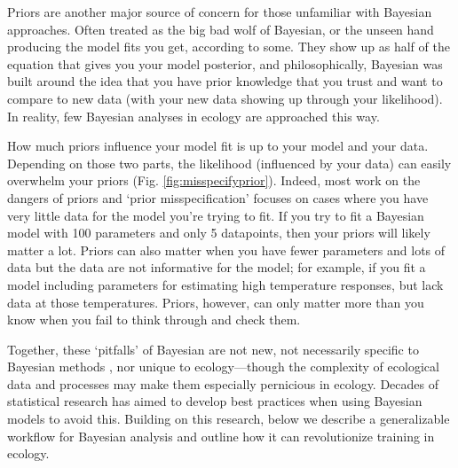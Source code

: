 \documentclass[11pt]{article}
\begin{document}
{%
Priors are another major source of concern for those unfamiliar with Bayesian approaches. Often treated as the big bad wolf of Bayesian, or the unseen hand producing the model fits you get, according to some. They show up as half of the equation that gives you your model posterior, and philosophically, Bayesian was built around the idea that you have prior knowledge that you trust and want to compare to new data (with your new data showing up through your likelihood). In reality, few Bayesian analyses in ecology are approached this way. 

How much priors influence your model fit is up to your model and your data. Depending on those two parts, the likelihood (influenced by your data) can easily overwhelm your priors (Fig. \ref{fig:misspecifyprior}). Indeed, most work on the dangers of priors and `prior misspecification'  focuses on cases where you have very little data for the model you're trying to fit. If you try to fit a Bayesian model with 100 parameters and only 5 datapoints, then your priors will likely matter a lot. Priors can also matter when you have fewer parameters and lots of data but the data are not informative for the model; for example, if you fit a model including parameters for estimating high temperature responses, but lack data at those temperatures. Priors, however, can only matter more than you know when you fail to think through and check them. 

Together, these `pitfalls' of Bayesian are not new, not necessarily specific to Bayesian methods \citep{low2014rising}, nor unique to ecology---though the complexity of ecological data and processes may make them especially pernicious in ecology. Decades of statistical research has aimed to develop best practices when using Bayesian models to avoid this. Building on this research, below we describe a generalizable workflow for Bayesian analysis and outline how it can revolutionize training in ecology.

}
\end{document}
